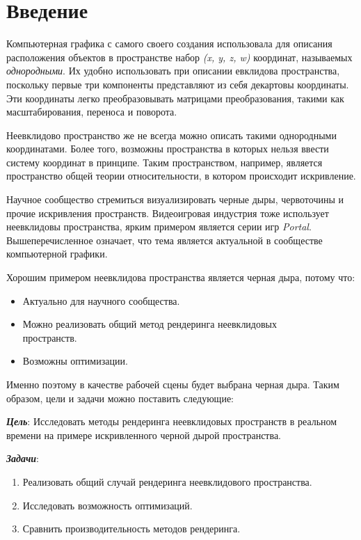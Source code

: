 \section{Введение}
\label{sec:Chapter0} 

Компьютерная графика с самого своего создания использовала для описания расположения объектов в пространстве набор \textit{(x, y, z, w)} координат, называемых \textit{однородными}. Их удобно использовать при описании евклидова пространства, поскольку первые три компоненты представляют из себя декартовы координаты. Эти координаты легко преобразовывать матрицами преобразования, такими как масштабирования, переноса и поворота.

Неевклидово пространство же не всегда можно описать такими однородными координатами. Более того, возможны пространства в которых нельзя ввести систему координат в принципе. Таким пространством, например, является пространство общей теории относительности, в котором происходит искривление.

Научное сообщество стремиться визуализировать черные дыры, червоточины и прочие искривления пространств. Видеоигровая индустрия тоже использует неевклидовы пространства, ярким примером является серии игр \textit{Portal}. Вышеперечисленное означает, что тема является актуальной в сообществе компьютерной графики.

Хорошим примером неевклидова пространства является черная дыра, потому что:
\begin{itemize}
  \item Актуально для научного сообщества.
  \item Можно реализовать общий метод рендеринга неевклидовых \\
  пространств.
  \item Возможны оптимизации.
\end{itemize}

Именно поэтому в качестве рабочей сцены будет выбрана черная дыра. Таким образом, цели и задачи можно поставить следующие:

\textbf{\textit{Цель}}: Исследовать методы рендеринга неевклидовых пространств в реальном времени на примере искривленного черной дырой пространства.

\newpage

\textbf{\textit{Задачи}}:
\begin{enumerate}
  \item Реализовать общий случай рендеринга неевклидового пространства.
  \item Исследовать возможность оптимизаций.
  \item Сравнить производительность методов рендеринга.
\end{enumerate}

\newpage
